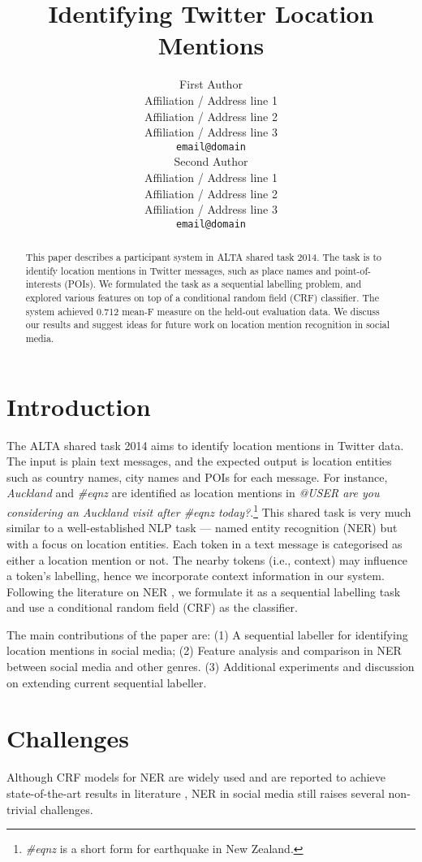 \documentclass[11pt]{article}
\title{Identifying Twitter Location Mentions}
\author{First Author \\
  Affiliation / Address line 1 \\
  Affiliation / Address line 2 \\
  Affiliation / Address line 3 \\
  {\tt email@domain} \\\And
  Second Author \\
  Affiliation / Address line 1 \\
  Affiliation / Address line 2 \\
  Affiliation / Address line 3 \\
  {\tt email@domain} \\}
\date{}
\newcommand{\ie}{i.e.,\xspace}
\newcommand{\myex}[1]{\textit{#1}}
\begin{document}
\maketitle
\begin{abstract}
    This paper describes a participant system in ALTA shared task 2014.
    The task is to identify location mentions in Twitter messages, such as place names and point-of-interests (POIs).
    We formulated the task as a sequential labelling problem, and explored various features on top of a conditional random field (CRF) classifier.
    The system achieved 0.712 mean-F measure on the held-out evaluation data.
    We discuss our results and suggest ideas for future work on location mention recognition in social media.
\end{abstract}

\section{Introduction}
\label{sec:intro}
The ALTA shared task 2014 aims to identify location mentions in Twitter data.
The input is plain text messages, and the expected output is location entities such as country names, city names and POIs for each message.
For instance, \myex{Auckland} and \myex{\#eqnz} are identified as location mentions in \myex{@USER are you considering an Auckland visit after \#eqnz today?}.\footnote{\myex{\#eqnz} is a short form for earthquake in New Zealand.}
This shared task is very much similar to a well-established NLP task --- named entity recognition (NER) but with a focus on location entities.
Each token in a text message is categorised as either a location mention or not.
The nearby tokens (\ie context) may influence a token's labelling, hence we incorporate context information in our system.
Following the literature on NER \cite{wwwc13ling}, we formulate it as a sequential labelling task and use a conditional random field (CRF) as the classifier.

The main contributions of the paper are:
(1) A sequential labeller for identifying location mentions in social media;
(2) Feature analysis and comparison in NER between social media and other genres.
(3) Additional experiments and discussion on extending current sequential labeller.

\section{Challenges}
\label{sec:challenge}
Although CRF models for NER are widely used and are reported to achieve state-of-the-art results in literature \cite{acl05fink,acl11liux,emnlp11ritt}, NER in social media still raises several non-trivial challenges.
\end{document}
